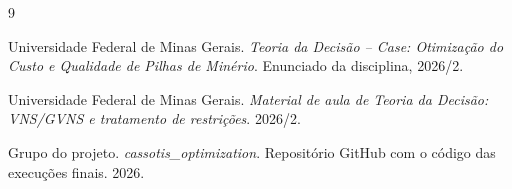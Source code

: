 \documentclass[10pt,twocolumn,a4paper]{article}
\begin{document}
{\small
\begin{thebibliography}{9}

Universidade Federal de Minas Gerais. \textit{Teoria da Decisão -- Case: Otimização do Custo e Qualidade de Pilhas de Minério}. Enunciado da disciplina, 2026/2.

Universidade Federal de Minas Gerais. \textit{Material de aula de Teoria da Decisão: VNS/GVNS e tratamento de restrições}. 2026/2.

Grupo do projeto. \textit{cassotis\_optimization}. Repositório GitHub com o código das execuções finais. 2026.

\end{thebibliography}
}
\end{document}
